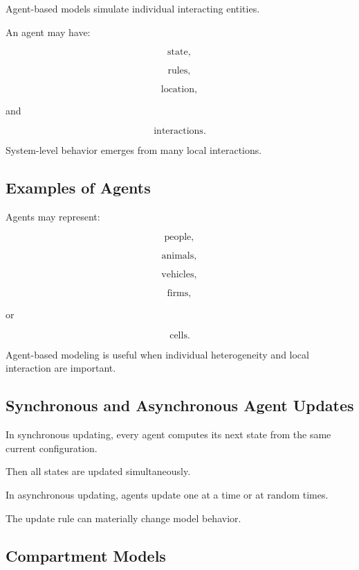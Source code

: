 Agent-based models simulate individual interacting entities.

An agent may have:

\[
\boxed{
\text{state},
}
\]

\[
\boxed{
\text{rules},
}
\]

\[
\boxed{
\text{location},
}
\]

and

\[
\boxed{
\text{interactions}.
}
\]

System-level behavior emerges from many local interactions.

\subsection{Examples of Agents}
\label{subsec:simulation-agent-examples}

Agents may represent:

\[
\boxed{
\text{people},
}
\]

\[
\boxed{
\text{animals},
}
\]

\[
\boxed{
\text{vehicles},
}
\]

\[
\boxed{
\text{firms},
}
\]

or

\[
\boxed{
\text{cells}.
}
\]

Agent-based modeling is useful when individual heterogeneity and local
interaction are important.

\subsection{Synchronous and Asynchronous Agent Updates}
\label{subsec:agent-update-rules}

In synchronous updating, every agent computes its next state from the same
current configuration.

Then all states are updated simultaneously.

In asynchronous updating, agents update one at a time or at random times.

The update rule can materially change model behavior.

\subsection{Compartment Models}
\label{subsec:simulation-compartment-models}

